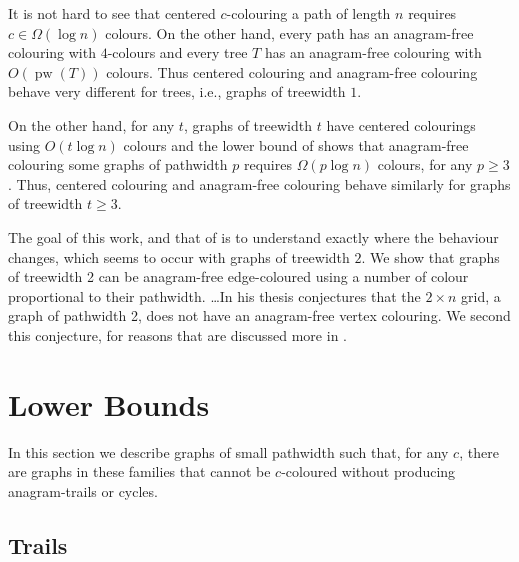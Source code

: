 \documentclass[kpfonts]{patmorin}
\DeclareMathOperator{\pw}{pw}
\DeclareMathOperator{\ci}{\overline{\pi}}
\begin{document}
It is not hard to see that centered $c$-colouring a path of length $n$ requires $c\in \Omega(\log n)$ colours. On the other hand, every path has an anagram-free colouring with $4$-colours and every tree $T$ has an anagram-free colouring with $O(\pw(T))$ colours. Thus centered colouring and anagram-free colouring behave very different for trees, i.e., graphs of treewidth $1$.

On the other hand, for any $t$, graphs of treewidth $t$ have centered colourings using $O(t\log n)$ colours and the lower bound of \citet{carmi.dujmovic.ea:anagram-free} shows that anagram-free colouring some graphs of pathwidth $p$ requires $\Omega(p\log n)$ colours, for any $p\ge 3$.  Thus, centered colouring and anagram-free colouring behave similarly for graphs of treewidth $t\ge 3$.

The goal of this work, and that of \cite{carmi.dujmovic.ea:anagram-free} is to understand exactly where the behaviour changes, which seems to occur with graphs of treewidth $2$.  We show that graphs of treewidth 2 can be anagram-free edge-coloured using a number of colour proportional to their pathwidth.  \ldots  In his thesis \citet{wilson:thesis} conjectures that the $2\times n$ grid, a graph of pathwidth 2, does not have an anagram-free vertex colouring.  We second this conjecture, for reasons that are discussed more in .











\section{Lower Bounds}

In this section we describe graphs of small pathwidth such that, for any $c$, there are graphs in these families that cannot be $c$-coloured without producing anagram-trails or cycles.

\subsection{Trails}
\end{document}
